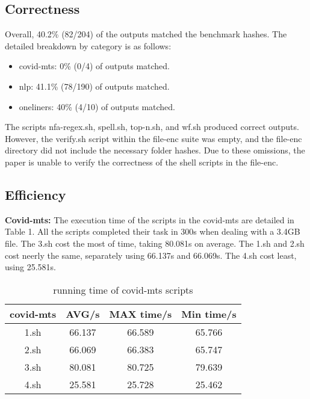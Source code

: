 \documentclass[sigplan, screen, 10pt]{acmart}
\begin{document}
\subsection{Correctness}
Overall, 40.2\% (82/204) of the outputs matched the benchmark hashes. The detailed breakdown by category is as follows:
\begin{itemize}
    \item covid-mts: 0\% (0/4) of outputs matched.
    \item nlp: 41.1\% (78/190) of outputs matched.
    \item oneliners: 40\% (4/10) of outputs matched.
\end{itemize}
The scripts nfa-regex.sh, spell.sh, top-n.sh, and wf.sh produced correct outputs.
However, the verify.sh script within the file-enc suite was empty, and the file-enc directory did not include the necessary folder hashes.
Due to these omissions, the paper is unable to verify the correctness of the shell scripts in the file-enc.\newline


\subsection{Efficiency}
\textbf{Covid-mts:}
The execution time of the scripts in the covid-mts are detailed in Table 1.
All the scripts completed their task in 300s when dealing with a 3.4GB file.
The 3.sh cost the most of time, taking 80.081s on average.
The 1.sh and 2.sh cost neerly the same, separately using 66.137s and 66.069s.
The 4.sh cost least, using 25.581s.
 
\begin{table}[]
    \centering
    \begin{tabular}{c|c|c|c}
         \textbf{covid-mts}& \textbf{AVG/s} & \textbf{MAX time/s} & \textbf{Min time/s} \\
         \hline
         1.sh & 66.137 & 66.589 & 65.766 \\
         2.sh & 66.069 & 66.383 & 65.747\\
         3.sh & 80.081 & 80.725 & 79.639 \\
         4.sh & 25.581 & 25.728 & 25.462 \\
         \hline
    \end{tabular}
    \caption{running time of covid-mts scripts}
\end{table}
\end{document}

